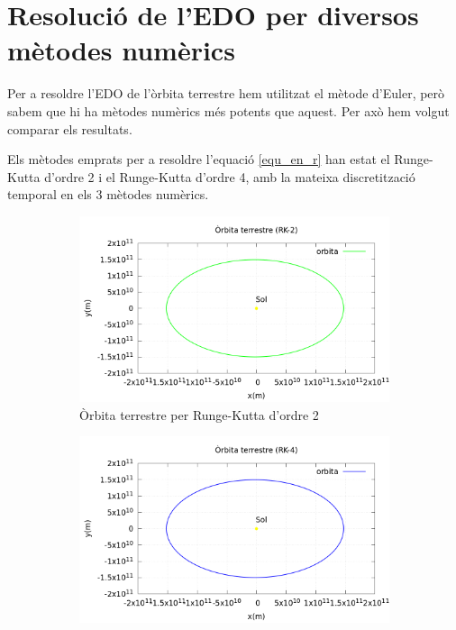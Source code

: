\documentclass[11pt]{article}
\begin{document}
\section{Resolució de l'EDO per diversos mètodes numèrics}\label{sec: edos}
Per a resoldre l'EDO de l'òrbita terrestre hem utilitzat el mètode d'Euler, però sabem que hi ha mètodes numèrics més potents que aquest. Per axò hem volgut comparar els resultats.

Els mètodes emprats per a resoldre l'equació \eqref{equ_en_r} han estat el Runge-Kutta d'ordre 2 i el Runge-Kutta d'ordre 4, amb la mateixa discretització temporal en els 3 mètodes numèrics.

\begin{figure}[hbt!]
    \centering
    \begin{subfigure}{0.5\textwidth}
        \centering
        \includegraphics[width=\textwidth]{orbitaRK2.PNG}
        \caption{Òrbita terrestre per Runge-Kutta d'ordre 2}
        \label{fig: orbitaRK2}
    \end{subfigure}%
    \vspace{0.01\textwidth}%
    \begin{subfigure}{0.5\textwidth}
        \centering
        \includegraphics[width=\textwidth]{orbitaRK4.PNG}

\end{subfigure}
\end{figure}
\end{document}
